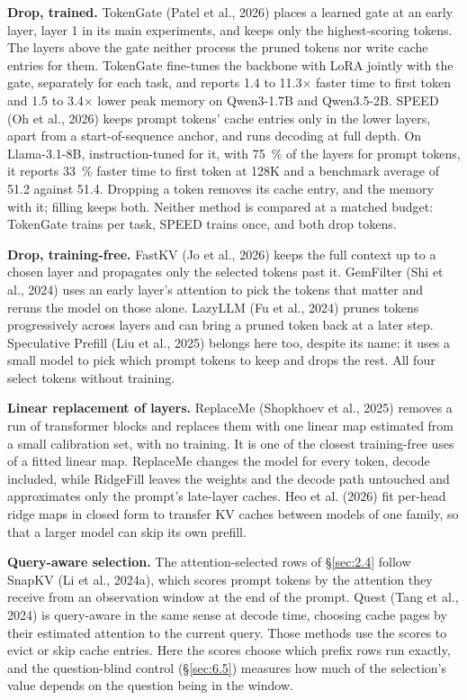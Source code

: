 \documentclass[11pt]{article}
\begin{document}
\textbf{Drop, trained.} TokenGate (Patel et al., 2026) places a learned gate at an early layer, layer 1 in its main experiments, and keeps only the highest-scoring tokens. The layers above the gate neither process the pruned tokens nor write cache entries for them. TokenGate fine-tunes the backbone with LoRA jointly with the gate, separately for each task, and reports 1.4 to 11.3$\times$ faster time to first token and 1.5 to 3.4$\times$ lower peak memory on Qwen3-1.7B and Qwen3.5-2B. SPEED (Oh et al., 2026) keeps prompt tokens' cache entries only in the lower layers, apart from a start-of-sequence anchor, and runs decoding at full depth. On Llama-3.1-8B, instruction-tuned for it, with 75~\% of the layers for prompt tokens, it reports 33~\% faster time to first token at 128K and a benchmark average of 51.2 against 51.4. Dropping a token removes its cache entry, and the memory with it; filling keeps both. Neither method is compared at a matched budget: TokenGate trains per task, SPEED trains once, and both drop tokens.

\textbf{Drop, training-free.} FastKV (Jo et al., 2026) keeps the full context up to a chosen layer and propagates only the selected tokens past it. GemFilter (Shi et al., 2024) uses an early layer's attention to pick the tokens that matter and reruns the model on those alone. LazyLLM (Fu et al., 2024) prunes tokens progressively across layers and can bring a pruned token back at a later step. Speculative Prefill (Liu et al., 2025) belongs here too, despite its name: it uses a small model to pick which prompt tokens to keep and drops the rest. All four select tokens without training.

\textbf{Linear replacement of layers.} ReplaceMe (Shopkhoev et al., 2025) removes a run of transformer blocks and replaces them with one linear map estimated from a small calibration set, with no training. It is one of the closest training-free uses of a fitted linear map. ReplaceMe changes the model for every token, decode included, while RidgeFill leaves the weights and the decode path untouched and approximates only the prompt's late-layer caches. Heo et al. (2026) fit per-head ridge maps in closed form to transfer KV caches between models of one family, so that a larger model can skip its own prefill.

\textbf{Query-aware selection.} The attention-selected rows of \S\ref{sec:2.4} follow SnapKV (Li et al., 2024a), which scores prompt tokens by the attention they receive from an observation window at the end of the prompt. Quest (Tang et al., 2024) is query-aware in the same sense at decode time, choosing cache pages by their estimated attention to the current query. Those methods use the scores to evict or skip cache entries. Here the scores choose which prefix rows run exactly, and the question-blind control (\S\ref{sec:6.5}) measures how much of the selection's value depends on the question being in the window.
\end{document}
